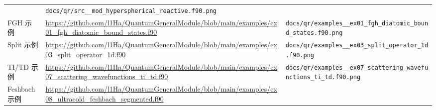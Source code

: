 \documentclass[
  a4paper,
]{ctexbook}
\begin{document}
\begin{longtable}[]{@{}lll@{}}
\begin{minipage}[t]{0.30\columnwidth}
\end{minipage} & \begin{minipage}[t]{0.30\columnwidth}\raggedright
\texttt{docs/qr/src\_\_mod\_hyperspherical\_reactive.f90.png}\strut
\end{minipage}\tabularnewline
\begin{minipage}[t]{0.30\columnwidth}\raggedright
FGH 示例\strut
\end{minipage} & \begin{minipage}[t]{0.30\columnwidth}\raggedright
\url{https://github.com/l1Ha/QuantumGeneralModule/blob/main/examples/ex01_fgh_diatomic_bound_states.f90}\strut
\end{minipage} & \begin{minipage}[t]{0.30\columnwidth}\raggedright
\texttt{docs/qr/examples\_\_ex01\_fgh\_diatomic\_bound\_states.f90.png}\strut
\end{minipage}\tabularnewline
\begin{minipage}[t]{0.30\columnwidth}\raggedright
Split 示例\strut
\end{minipage} & \begin{minipage}[t]{0.30\columnwidth}\raggedright
\url{https://github.com/l1Ha/QuantumGeneralModule/blob/main/examples/ex03_split_operator_1d.f90}\strut
\end{minipage} & \begin{minipage}[t]{0.30\columnwidth}\raggedright
\texttt{docs/qr/examples\_\_ex03\_split\_operator\_1d.f90.png}\strut
\end{minipage}\tabularnewline
\begin{minipage}[t]{0.30\columnwidth}\raggedright
TI/TD 示例\strut
\end{minipage} & \begin{minipage}[t]{0.30\columnwidth}\raggedright
\url{https://github.com/l1Ha/QuantumGeneralModule/blob/main/examples/ex07_scattering_wavefunctions_ti_td.f90}\strut
\end{minipage} & \begin{minipage}[t]{0.30\columnwidth}\raggedright
\texttt{docs/qr/examples\_\_ex07\_scattering\_wavefunctions\_ti\_td.f90.png}\strut
\end{minipage}\tabularnewline
\begin{minipage}[t]{0.30\columnwidth}\raggedright
Feshbach 示例\strut
\end{minipage} & \begin{minipage}[t]{0.30\columnwidth}\raggedright
\url{https://github.com/l1Ha/QuantumGeneralModule/blob/main/examples/ex08_ultracold_feshbach_segmented.f90}\strut

\end{minipage}
\end{longtable}
\end{document}

